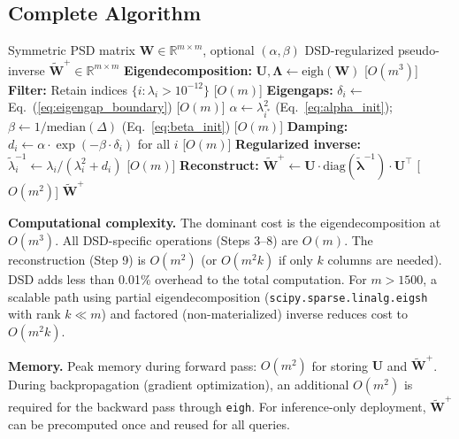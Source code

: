 \documentclass[preprint,review,12pt]{elsarticle}
\begin{document}
\subsection{Complete Algorithm}

\begin{algorithm}[!t]
\caption{Differential Spectral Damping (DSD)}
\label{alg:dsd}
\begin{algorithmic}[1]
\REQUIRE Symmetric PSD matrix $\bm{W} \in \mathbb{R}^{m \times m}$, optional $(\alpha, \beta)$
\ENSURE DSD-regularized pseudo-inverse $\tilde{\bm{W}}^+ \in \mathbb{R}^{m \times m}$
\STATE \textbf{Eigendecomposition:} $\bm{U}, \bm{\Lambda} \leftarrow \text{eigh}(\bm{W})$ \hfill [$O(m^3)$]
\STATE \textbf{Filter:} Retain indices $\{i : \lambda_i > 10^{-12}\}$ \hfill [$O(m)$]
\STATE \textbf{Eigengaps:} $\delta_i \leftarrow$ Eq.~(\ref{eq:eigengap_boundary}) \hfill [$O(m)$]
    \STATE $\alpha \leftarrow \lambda_{i^*}^2$ (Eq.~\ref{eq:alpha_init}); \quad $\beta \leftarrow 1/\text{median}(\Delta)$ (Eq.~\ref{eq:beta_init}) \hfill [$O(m)$]
\ENDIF
\STATE \textbf{Damping:} $d_i \leftarrow \alpha \cdot \exp(-\beta \cdot \delta_i)$ for all $i$ \hfill [$O(m)$]
\STATE \textbf{Regularized inverse:} $\tilde{\lambda}_i^{-1} \leftarrow \lambda_i / (\lambda_i^2 + d_i)$ \hfill [$O(m)$]
\STATE \textbf{Reconstruct:} $\tilde{\bm{W}}^+ \leftarrow \bm{U} \cdot \text{diag}(\tilde{\bm{\lambda}}^{-1}) \cdot \bm{U}^\top$ \hfill [$O(m^2)$]
\RETURN $\tilde{\bm{W}}^+$
\end{algorithmic}
\end{algorithm}

\textbf{Computational complexity.} The dominant cost is the eigendecomposition at $O(m^3)$. All DSD-specific operations (Steps 3--8) are $O(m)$. The reconstruction (Step 9) is $O(m^2)$ (or $O(m^2 k)$ if only $k$ columns are needed). DSD adds less than 0.01\% overhead to the total computation. For $m > 1500$, a scalable path using partial eigendecomposition (\texttt{scipy.sparse.linalg.eigsh} with rank $k \ll m$) and factored (non-materialized) inverse reduces cost to $O(m^2 k)$.

\textbf{Memory.} Peak memory during forward pass: $O(m^2)$ for storing $\bm{U}$ and $\tilde{\bm{W}}^+$. During backpropagation (gradient optimization), an additional $O(m^2)$ is required for the backward pass through \texttt{eigh}. For inference-only deployment, $\tilde{\bm{W}}^+$ can be precomputed once and reused for all queries.


\end{document}

